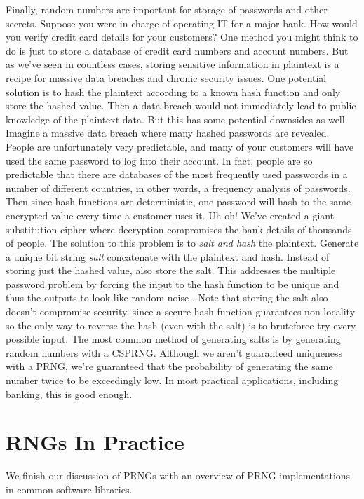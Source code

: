 \documentclass[titlepage]{article}
\theoremstyle{definition}
\begin{document}
Finally, random numbers are important for storage of passwords and other secrets. Suppose you were in charge of operating IT for a major bank. How would you verify credit card details for your customers? One method you might think to do is just to store a database of credit card numbers and account numbers. But as we've seen in countless cases, storing sensitive information in plaintext is a recipe for massive data breaches and chronic security issues. One potential solution is to hash the plaintext according to a known hash function and only store the hashed value. Then a data breach would not immediately lead to public knowledge of the plaintext data. But this has some potential downsides as well. Imagine a massive data breach where many hashed passwords are revealed. People are unfortunately very predictable, and many of your customers will have used the same password to log into their account. In fact, people are so predictable that there are databases of the most frequently used passwords in a number of different countries, in other words, a frequency analysis of passwords. Then since hash functions are deterministic, one password will hash to the same encrypted value every time a customer uses it. Uh oh! We've created a giant substitution cipher where decryption compromises the bank details of thousands of people. The solution to this problem is to \textit{salt and hash} the plaintext. Generate a unique bit string \textit{salt} concatenate with the plaintext and hash. Instead of storing just the hashed value, also store the salt. This addresses the multiple password problem by forcing the input to the hash function to be unique and thus the outputs to look like random noise \cite{Salt}. Note that storing the salt also doesn't compromise security, since a secure hash function guarantees non-locality so the only way to reverse the hash (even with the salt) is to bruteforce try every possible input. The most common method of generating salts is by generating random numbers with a CSPRNG. Although we aren't guaranteed uniqueness with a PRNG, we're guaranteed that the probability of generating the same number twice to be exceedingly low. In most practical applications, including banking, this is good enough.

\section{RNGs In Practice}
We finish our discussion of PRNGs with an overview of PRNG implementations in common software libraries.
\end{document}
